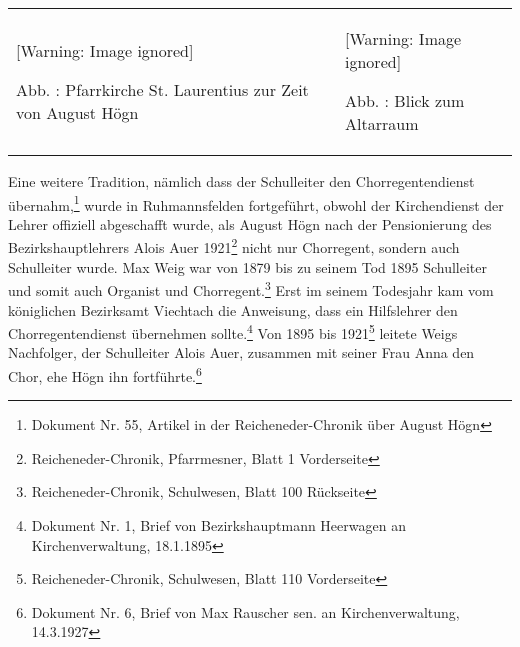 \documentclass[a4paper]{article}
\newcommand\textstyleFootnoteSymbol[1]{\textsuperscript{#1}}
\newcommand\textstyleFunotenTextZchn[1]{#1}
\newcounter{Abb}
\renewcommand\theAbb{\arabic{Abb}}
\begin{document}
\begin{center}
\begin{minipage}{9.491cm}
\begin{flushleft}
\tablefirsthead{}
\tablehead{}
\tabletail{}
\tablelasttail{}
\begin{supertabular}{m{4.8960004cm}m{4.196cm}}
  [Warning: Image ignored] %
 
Abb. \stepcounter{Abb}{\theAbb}: Pfarrkirche St. Laurentius zur Zeit von
August Högn &
  [Warning: Image ignored] %
 
Abb. \stepcounter{Abb}{\theAbb}: Blick zum Altarraum\\
\end{supertabular}
\end{flushleft}
\end{minipage}
\end{center}
Eine weitere Tradition, nämlich dass der Schulleiter den
Chorregentendienst übernahm,\footnote{ Dokument Nr. 55, Artikel in der
Reicheneder-Chronik über August Högn} wurde in Ruhmannsfelden
fortgeführt, obwohl der Kirchendienst der Lehrer offiziell abgeschafft
wurde, als August Högn nach der Pensionierung des Bezirkshauptlehrers
Alois Auer 1921\footnote{ Reicheneder-Chronik, Pfarrmesner, Blatt 1
\textstyleFunotenTextZchn{Vorderseite}} nicht nur Chorregent, sondern
auch Schulleiter wurde. Max Weig war von 1879 bis zu seinem Tod 1895
Schulleiter und somit auch Organist und Chorregent.\footnote{
Reicheneder-Chronik, Schulwesen, Blatt 100
Rückseite}\textstyleFootnoteSymbol{ }Erst im seinem Todesjahr kam vom
königlichen Bezirksamt Viechtach die Anweisung, dass ein Hilfslehrer
den Chorregentendienst übernehmen sollte.\footnote{ Dokument Nr. 1,
Brief von Bezirkshauptmann Heerwagen an Kirchenverwaltung, 18.1.1895}
Von 1895 bis 1921\footnote{ Reicheneder-Chronik, Schulwesen, Blatt 110
Vorderseite} leitete Weigs Nachfolger, der Schulleiter Alois Auer,
zusammen mit seiner Frau Anna den Chor, ehe Högn ihn
fortführte.\footnote{ Dokument Nr. 6, Brief von Max Rauscher sen. an
Kirchenverwaltung, 14.3.1927}
\end{document}
